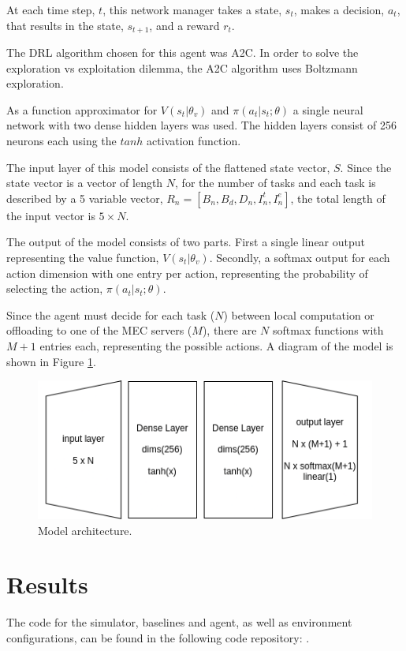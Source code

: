 \documentclass[conference]{IEEEtran}
\begin{document}
At each time step, $t$, this network manager takes a state, $s_t$, makes a decision, $a_t$, that results in the state, $s_{t+1}$, and a reward $r_t$.

The \acrshort{DRL} algorithm chosen for this agent was \acrshort{A2C}. In order to solve the exploration vs exploitation dilemma, the \acrshort{A2C} algorithm uses Boltzmann exploration.

As a function approximator for $V(s_t | \theta_v)$ and $\pi(a_t | s_t; \theta)$ a single neural network with two dense hidden layers was used. The hidden layers consist of 256 neurons each using the $tanh$ activation function. 

The input layer of this model consists of the flattened state vector, $S$. Since the state vector is a vector of length $N$, for the number of tasks and each task is described by a 5 variable vector, $R_n = [B_n, B_d, D_n, I_n^t, I_n^e]$, the total length of the input vector is $5 \times N$. 

The output of the model consists of two parts. First a single linear output representing the value function, $V(s_t | \theta_v)$. Secondly, a softmax output for each action dimension with one entry per action, representing the probability of selecting the action, $\pi(a_t | s_t; \theta)$. 

Since the agent must decide for each task ($N$) between local computation or offloading to one of the MEC servers ($M$), there are $N$ softmax functions with $M+1$ entries each, representing the possible actions. A diagram of the model is shown in Figure \ref{fig:model}.

\begin{figure}[H]
  \centering
  \includegraphics[width=\linewidth]{images/model_arch.png}
  \caption{Model architecture.}
  \label{fig:model}
\end{figure}

\section{Results}
\label{sec:results}
The code for the simulator, baselines and agent, as well as environment configurations, can be found in the following code repository: .
\end{document}
